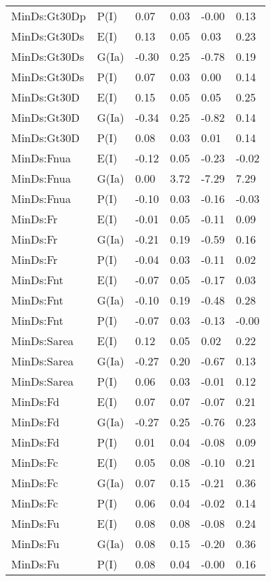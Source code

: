 \begin{center}
\begin{longtable}{|p{1.1in}|p{0.7in}|p{0.7in}|p{0.6in}|p{0.6in}|p{0.6in}|}
  MinDs:Gt30Dp & P(I) & 0.07 & 0.03 & -0.00 & 0.13 \\ 
  MinDs:Gt30Ds & E(I) & 0.13 & 0.05 & 0.03 & 0.23 \\ 
  MinDs:Gt30Ds & G(Ia) & -0.30 & 0.25 & -0.78 & 0.19 \\ 
  MinDs:Gt30Ds & P(I) & 0.07 & 0.03 & 0.00 & 0.14 \\ 
  MinDs:Gt30D & E(I) & 0.15 & 0.05 & 0.05 & 0.25 \\ 
  MinDs:Gt30D & G(Ia) & -0.34 & 0.25 & -0.82 & 0.14 \\ 
  MinDs:Gt30D & P(I) & 0.08 & 0.03 & 0.01 & 0.14 \\ 
  MinDs:Fnua & E(I) & -0.12 & 0.05 & -0.23 & -0.02 \\ 
  MinDs:Fnua & G(Ia) & 0.00 & 3.72 & -7.29 & 7.29 \\ 
  MinDs:Fnua & P(I) & -0.10 & 0.03 & -0.16 & -0.03 \\ 
  MinDs:Fr & E(I) & -0.01 & 0.05 & -0.11 & 0.09 \\ 
  MinDs:Fr & G(Ia) & -0.21 & 0.19 & -0.59 & 0.16 \\ 
  MinDs:Fr & P(I) & -0.04 & 0.03 & -0.11 & 0.02 \\ 
  MinDs:Fnt & E(I) & -0.07 & 0.05 & -0.17 & 0.03 \\ 
  MinDs:Fnt & G(Ia) & -0.10 & 0.19 & -0.48 & 0.28 \\ 
  MinDs:Fnt & P(I) & -0.07 & 0.03 & -0.13 & -0.00 \\ 
  MinDs:Sarea & E(I) & 0.12 & 0.05 & 0.02 & 0.22 \\ 
  MinDs:Sarea & G(Ia) & -0.27 & 0.20 & -0.67 & 0.13 \\ 
  MinDs:Sarea & P(I) & 0.06 & 0.03 & -0.01 & 0.12 \\ 
  MinDs:Fd & E(I) & 0.07 & 0.07 & -0.07 & 0.21 \\ 
  MinDs:Fd & G(Ia) & -0.27 & 0.25 & -0.76 & 0.23 \\ 
  MinDs:Fd & P(I) & 0.01 & 0.04 & -0.08 & 0.09 \\ 
  MinDs:Fc & E(I) & 0.05 & 0.08 & -0.10 & 0.21 \\ 
  MinDs:Fc & G(Ia) & 0.07 & 0.15 & -0.21 & 0.36 \\ 
  MinDs:Fc & P(I) & 0.06 & 0.04 & -0.02 & 0.14 \\ 
  MinDs:Fu & E(I) & 0.08 & 0.08 & -0.08 & 0.24 \\ 
  MinDs:Fu & G(Ia) & 0.08 & 0.15 & -0.20 & 0.36 \\ 
  MinDs:Fu & P(I) & 0.08 & 0.04 & -0.00 & 0.16 \\ 

\end{longtable}
\end{center}
